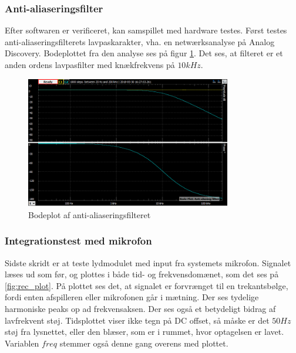 \subsubsection{Anti-aliaseringsfilter}
Efter softwaren er verificeret, kan samspillet med hardware testes. 
Først testes anti-aliaseringsfilterets lavpaskarakter, vha. en netwærksanalyse på Analog Discovery.
Bodeplottet fra den analyse ses på figur \ref{fig:LP_bodeplot}.
Det ses, at filteret er et anden ordens lavpasfilter med knækfrekvens på $10 kHz$. 
\begin{figure}[H]
	\center
	\includegraphics[width=0.8\textwidth]{Figur/test_LP_sweep.png}
	\caption{Bodeplot af anti-aliaseringsfilteret}
	\label{fig:LP_bodeplot}
\end{figure}


\subsubsection{Integrationstest med mikrofon}
Sidste skridt er at teste lydmodulet med input fra systemets mikrofon. 
Signalet læses ud som før, og plottes i både tid- og frekvensdomænet, som det ses på \ref{fig:rec_plot}.
På plottet ses det, at signalet er forvrænget til en trekantsbølge, fordi enten afspilleren eller mikrofonen går i mætning. 
Der ses tydelige harmoniske peaks op ad frekvensaksen. 
Der ses også et betydeligt bidrag af lavfrekvent støj. 
Tidsplottet viser ikke tegn på DC offset, så måske er det $50 Hz$ støj fra lysnettet, eller den blæser, som er i rummet, hvor optagelsen er lavet. 
Variablen $freq$ stemmer også denne gang overens med plottet. 

